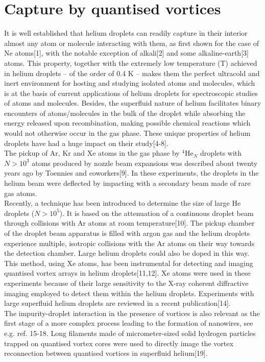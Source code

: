 	\section{Capture by quantised vortices}
		It is well established that helium droplets can readily capture in their interior almost any atom or molecule interacting with them, as first shown for the case of Ne atoms[1], with the notable exception of alkali[2] and some alkaline-earth[3] atoms. This property, together with the extremely low temperature (T) achieved in helium droplets -- of the order of 0.4 K -- makes them the perfect ultracold and inert environment for hosting and studying isolated atoms and molecules, which is at the basis of current applications of helium droplets for spectroscopic studies of atoms and molecules. Besides, the superfluid nature of helium facilitates binary encounters of atoms/molecules in the bulk of the droplet while absorbing the energy released upon recombination, making possible chemical reactions which would not otherwise occur in the gas phase. These unique properties of helium droplets have had a huge impact on their study[4-8].\\

		The pickup of Ar, Kr and Xe atoms in the gas phase by $^4$He$_N$ droplets with $N>10^3$ atoms produced by nozzle beam expansions was described about twenty years ago by Toennies and coworkers[9]. In these experiments, the droplets in the helium beam were deflected by impacting with a secondary beam made of rare gas atoms.\\

		Recently, a technique has been introduced to determine the size of large He droplets ($N>10^5$). It is based on the attenuation of a continuous droplet beam through collisions with Ar atoms at room temperature[10]. The pickup chamber of the droplet beam apparatus is filled with argon gas and the helium droplets experience multiple, isotropic collisions with the Ar atoms on their way towards the detection chamber. Large helium droplets could also be doped in this way. This method, using Xe atoms, has been instrumental for detecting and imaging quantised vortex arrays in helium droplets[11,12]. Xe atoms were used in these experiments because of their large sensitivity to the X-ray coherent diffractive imaging employed to detect them within the helium droplets. Experiments with large superfluid helium droplets are reviewed in a recent publication[14].\\

		The impurity-droplet interaction in the presence of vortices is also relevant as the first stage of a more complex process leading to the formation of nanowires, see e.g. ref. 15-18. Long filaments made of micrometer-sized solid hydrogen particles trapped on quantised vortex cores were used to directly image the vortex reconnection between quantised vortices in superfluid helium[19].\\

